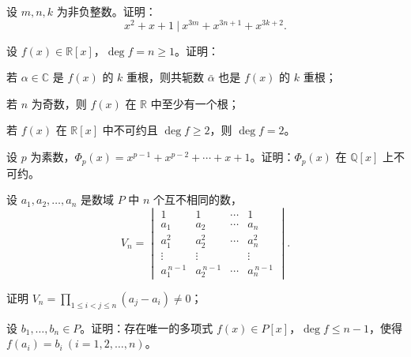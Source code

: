 \documentclass[11pt,a4paper,fontset=windows]{ctexart}
\begin{document}
\begin{qs}[resume*]
\item 设 $m,n,k$ 为非负整数。证明：
\[
x^{2}+x+1\ \Big|\ x^{3m}+x^{3n+1}+x^{3k+2}.
\]

\item 设 $f(x)\in\mathbb{R}[x]$，$\deg f=n\ge 1$。证明：
\begin{sub}
\item 若 $\alpha\in\mathbb{C}$ 是 $f(x)$ 的 $k$ 重根，则共轭数 $\bar\alpha$ 也是 $f(x)$ 的 $k$ 重根；
\item 若 $n$ 为奇数，则 $f(x)$ 在 $\mathbb{R}$ 中至少有一个根；
\item 若 $f(x)$ 在 $\mathbb{R}[x]$ 中不可约且 $\deg f\ge 2$，则 $\deg f=2$。
\end{sub}

\item 设 $p$ 为素数，$\Phi_p(x)=x^{p-1}+x^{p-2}+\cdots+x+1$。证明：$\Phi_p(x)$ 在 $\mathbb{Q}[x]$ 上不可约。

\item 设 $a_1,a_2,\ldots,a_n$ 是数域 $P$ 中 $n$ 个互不相同的数，
\[
V_n=\begin{vmatrix}
1&1&\cdots&1\\
a_1&a_2&\cdots&a_n\\
a_1^{2}&a_2^{2}&\cdots&a_n^{2}\\
\vdots&\vdots&&\vdots\\
a_1^{\,n-1}&a_2^{\,n-1}&\cdots&a_n^{\,n-1}
\end{vmatrix}.
\]
\begin{sub}
\item 证明 $V_n=\displaystyle\prod_{1\le i<j\le n}(a_j-a_i)\neq 0$；
\item 设 $b_1,\ldots,b_n\in P$。证明：存在唯一的多项式 $f(x)\in P[x]$，$\deg f\le n-1$，使得
$f(a_i)=b_i\ (i=1,2,\ldots,n)$。
\end{sub}
\end{qs}
\end{document}
